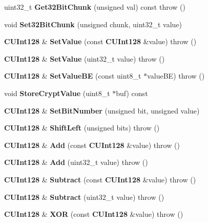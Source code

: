 \begin{DoxyCompactItemize}
\item 
uint32\_\-t {\bfseries Get32BitChunk} (unsigned val) const   throw ()\label{classKademlia_1_1CUInt128_a84ccf0d017b2853f5184b6c97e25b6b3}

\item 
void {\bfseries Set32BitChunk} (unsigned chunk, uint32\_\-t value)\label{classKademlia_1_1CUInt128_a603560d69a19c4156d5f87239deb220f}

\item 
{\bf CUInt128} \& {\bfseries SetValue} (const {\bf CUInt128} \&value)  throw ()\label{classKademlia_1_1CUInt128_abeab5f5b6605f7db512dbe5a716cc473}

\item 
{\bf CUInt128} \& {\bfseries SetValue} (uint32\_\-t value)  throw ()\label{classKademlia_1_1CUInt128_a501e91f77bdffefe8bad533bc14bddc8}

\item 
{\bf CUInt128} \& {\bfseries SetValueBE} (const uint8\_\-t $\ast$valueBE)  throw ()\label{classKademlia_1_1CUInt128_a141c433aae6a3cc6b518f013428f9b11}

\item 
void {\bf StoreCryptValue} (uint8\_\-t $\ast$buf) const 
\item 
{\bf CUInt128} \& {\bf SetBitNumber} (unsigned bit, unsigned value)
\item 
{\bf CUInt128} \& {\bfseries ShiftLeft} (unsigned bits)  throw ()\label{classKademlia_1_1CUInt128_a23faf69253344824375dc6104a7c3d11}

\item 
{\bf CUInt128} \& {\bfseries Add} (const {\bf CUInt128} \&value)  throw ()\label{classKademlia_1_1CUInt128_a92af5982bdb03ba12e0df869eb373973}

\item 
{\bf CUInt128} \& {\bfseries Add} (uint32\_\-t value)  throw ()\label{classKademlia_1_1CUInt128_a91df2909a2437cee37b38ff4de91bf4f}

\item 
{\bf CUInt128} \& {\bfseries Subtract} (const {\bf CUInt128} \&value)  throw ()\label{classKademlia_1_1CUInt128_a8a2b11a689094a6ed012fd90816468e3}

\item 
{\bf CUInt128} \& {\bfseries Subtract} (uint32\_\-t value)  throw ()\label{classKademlia_1_1CUInt128_a40ce42c3eec0def437bd4a105653abcd}

\item 
{\bf CUInt128} \& {\bfseries XOR} (const {\bf CUInt128} \&value)  throw ()\label{classKademlia_1_1CUInt128_a3cfb4ab69992274c2dca6e6b703c78aa}


\end{DoxyCompactItemize}
